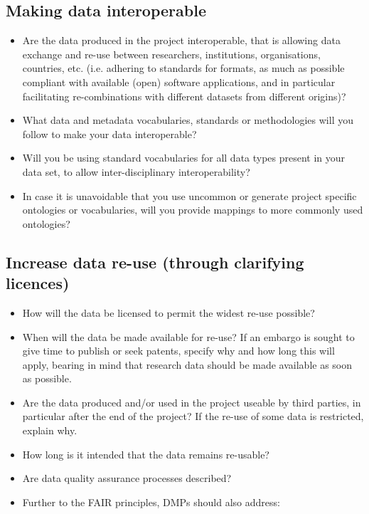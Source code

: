 \documentclass{article}
\begin{document}
\subsection{Making data interoperable}
\begin{itemize}
    \item Are the data produced in the project interoperable, that is allowing data exchange and re-use between researchers, institutions, organisations, countries, etc. (i.e. adhering to standards for formats, as much as possible compliant with available (open) software applications, and in particular facilitating re-combinations with different datasets from different origins)?
    \item What data and metadata vocabularies, standards or methodologies will you follow to make your data interoperable?
    \item Will you be using standard vocabularies for all data types present in your data set, to allow inter-disciplinary interoperability?
    \item In case it is unavoidable that you use uncommon or generate project specific ontologies or vocabularies, will you provide mappings to more commonly used ontologies?
\end{itemize}

\subsection{Increase data re-use (through clarifying licences)}
\begin{itemize}
    \item How will the data be licensed to permit the widest re-use possible?
    \item When will the data be made available for re-use? If an embargo is sought to give time to publish or seek patents, specify why and how long this will apply, bearing in mind that research data should be made available as soon as possible.
    \item Are the data produced and/or used in the project useable by third parties, in particular after the end of the project? If the re-use of some data is restricted, explain why.
    \item How long is it intended that the data remains re-usable?
    \item Are data quality assurance processes described?
    \item Further to the FAIR principles, DMPs should also address:
\end{itemize}
\end{document}
